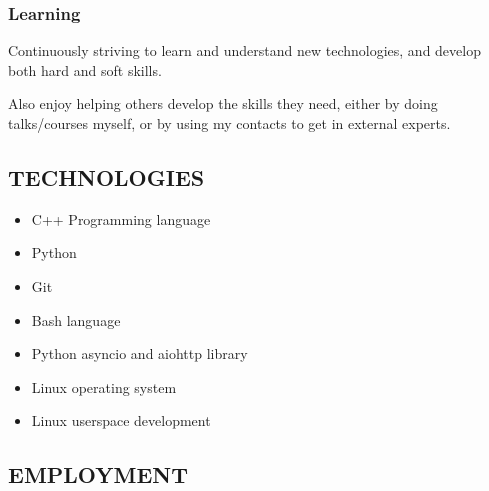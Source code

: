 \documentclass{article}
\begin{document}
\begin{multicols}{2}
\begin{addmargin}[2em]{0em}
    \subsubsection*{Learning}

    \begin{addmargin}[1em]{0em}
      Continuously striving to learn and understand new technologies, and develop both hard
      and soft skills.

      Also enjoy helping others develop the skills they need, either by doing talks/courses
      myself, or by using my contacts to get in external experts.
    \end{addmargin}

  \end{addmargin}

\end{multicols}

\subsection*{TECHNOLOGIES}

\begin{multicols}{2}

  \begin{itemize}
    \item C++ Programming language
    \item Python
    \item Git
    \item Bash language
    \item Python asyncio and aiohttp library
    \item Linux operating system
    \item Linux userspace development
  \end{itemize}
\end{multicols}

\subsection*{EMPLOYMENT}
\end{document}
